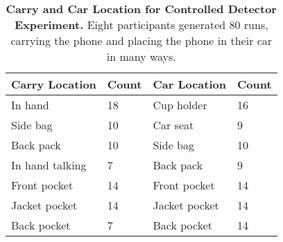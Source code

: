\begin{table}[t]
{\small
\begin{threeparttable}
\begin{tabularx}{\columnwidth}{b s b s}
  {{\textbf{Carry Location}}} & {{\textbf{Count}}} &
  {{\textbf{Car Location}}} &
  {{\textbf{Count}}} \\
 \hline
In hand & 18 & Cup holder & 16 \\
Side bag & 10 & Car seat  & 9 \\
Back pack & 10 & Side bag & 10 \\
In hand talking & 7 & Back pack & 9 \\
Front pocket & 14 & Front pocket & 14 \\
Jacket pocket & 14 & Jacket pocket & 14 \\
Back pocket & 7 & Back pocket & 14 \\
\end{tabularx}
\end{threeparttable}
\caption{\textbf{Carry and Car Location for Controlled Detector Experiment.}
Eight participants generated 80 runs, carrying the phone and placing the
phone in their car in many ways.}
\label{table-experiment}
}
\end{table}
